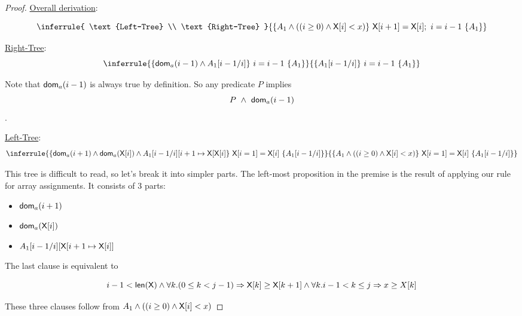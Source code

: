 \begin{enumerate}[(a)]
\begin{enumerate}[i.]
\begin{proof}
        \newcommand{\rightPremise}{
            \{ \dom_a(i - 1) \wedge A_1[i - 1/ i] \}
            ~i = i - 1~
            \{ A_1 \}
        }

        \newcommand{\rightBase}{
            \{ A_1[i - 1/ i] \}
            ~i = i - 1~
            \{ A_1 \}
        }
        \newcommand{\treeBase}{
            \{ A_1 \wedge ((i \geq 0) \wedge {\sf X}[i] < x) \}
            ~\X[i + 1] = \X[i];~i = i - 1~
            \{ A_1 \}
        }

        \underline{Overall derivation}:

        $$ \inferrule{
                \text{Left-Tree}
                \\
                \text{Right-Tree}
            }{\treeBase}
        $$

        \underline{Right-Tree}: \\
        $$ \inferrule{\rightPremise}{\rightBase} $$

        Note that ${\sf dom}_a(i - 1)$ is always true by definition. So any predicate
        $P$ implies $$P~\wedge~{\sf dom}_a(i - 1)$$.

        \underline{Left-Tree}:  \\
        $$ \inferrule{\leftPremise}{\leftBase} $$

        This tree is difficult to read, so let's break it into simpler parts.
        The left-most proposition in the premise is the result of applying
        our rule for array assignments. It consists of 3 parts:

        \begin{itemize}
        \item ${\sf dom}_a(i + 1)$
        \item ${\sf dom}_a({\sf X}[i])$
        \item $A_1[i - 1 / i][\textsf{X}[i + 1 \mapsto \textsf{X}[i]]$
        \end{itemize}

        The last clause is equivalent to

        $$
        i - 1 < {\sf len(X)}
        \wedge \forall k. (0 \leq k < j - 1) \Rightarrow \textsf{X}[k] \geq \textsf{X}[k + 1]
        \wedge \forall k . i - 1 < k \leq j \Rightarrow  x \geq X[k]
        $$

        These three clauses follow from $ A_1 \wedge ((i \geq 0) \wedge {\sf X}[i] < x) $


\end{proof}
\end{enumerate}
\end{enumerate}
